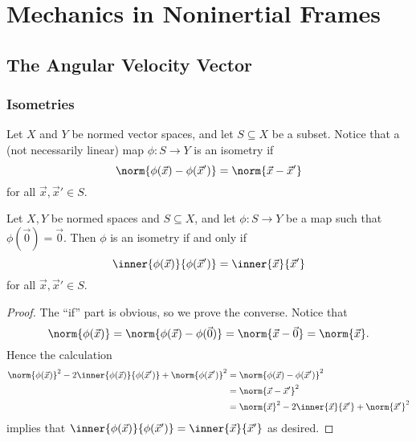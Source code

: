 \documentclass[article, a4paper, 11pt, oneside]{memoir}
\numberwithin{equation}{chapter}
\begin{document}
\addtocounter{chapter}{4}
\chapter{Mechanics in Noninertial Frames}

\addtocounter{section}{2}
\section{The Angular Velocity Vector}

\subsection{Isometries}

Let $X$ and $Y$ be normed vector spaces, and let $S \subseteq X$ be a subset. Notice that a (not necessarily linear) map $\phi \colon S \to Y$ is an isometry if
%
\begin{equation*}
    \norm{\phi(\vec{x}) - \phi(\vec{x}')}
        = \norm{\vec{x} - \vec{x}'}
\end{equation*}
%
for all $\vec{x}, \vec{x}' \in S$.

\begin{lemma}
    \label{lem:isometry-preserves-inner-product}
    Let $X,Y$ be normed spaces and $S \subseteq X$, and let $\phi \colon S \to Y$ be a map such that $\phi(\vec{0}) = \vec{0}$. Then $\phi$ is an isometry if and only if
    \begin{equation*}
        \inner{\phi(\vec{x})}{\phi(\vec{x}')}
            = \inner{\vec{x}}{\vec{x}'}
    \end{equation*}
    for all $\vec{x}, \vec{x}' \in S$.
\end{lemma}

\begin{proof}
    The \enquote{if} part is obvious, so we prove the converse. Notice that
    \begin{equation*}
        \norm{\phi(\vec{x})}
            = \norm{\phi(\vec{x}) - \phi(\vec{0})}
            = \norm{\vec{x} - \vec{0}}
            = \norm{\vec{x}}.
    \end{equation*}
    Hence the calculation
    \begin{align*}
        \norm{\phi(\vec{x})}^2 - 2 \inner{\phi(\vec{x})}{\phi(\vec{x}')} + \norm{\phi(\vec{x}')}^2
            &= \norm{\phi(\vec{x}) - \phi(\vec{x}')}^2 \\
            &= \norm{\vec{x} - \vec{x}'}^2 \\
            &= \norm{\vec{x}}^2 - 2 \inner{\vec{x}}{\vec{x}'} + \norm{\vec{x}'}^2
    \end{align*}
    implies that $\inner{\phi(\vec{x})}{\phi(\vec{x}')} = \inner{\vec{x}}{\vec{x}'}$ as desired.
\end{proof}
\end{document}
